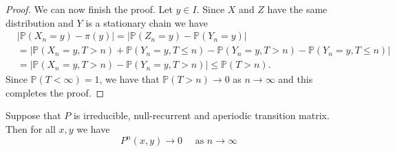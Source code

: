 \documentclass[a4paper]{article}
\begin{document}
\begin{proof}
    We can now finish the proof. Let $y \in I$. Since $X$ and $Z$ have the same distribution and $Y$ is a stationary chain we have
    \[
    \begin{aligned}
    &\left|\mathbb{P}\left(X_n=y\right)-\pi(y)\right|=\left|\mathbb{P}\left(Z_n=y\right)-\mathbb{P}\left(Y_n=y\right)\right| \\
    &=\left|\mathbb{P}\left(X_n=y, T>n\right)+\mathbb{P}\left(Y_n=y, T \leq n\right)-\mathbb{P}\left(Y_n=y, T>n\right)-\mathbb{P}\left(Y_n=y, T \leq n\right)\right| \\
    &=\left|\mathbb{P}\left(X_n=y, T>n\right)-\mathbb{P}\left(Y_n=y, T>n\right)\right| \leq \mathbb{P}(T>n) .
    \end{aligned}
    \]
    Since $\mathbb{P}(T<\infty)=1$, we have that $\mathbb{P}(T>n) \rightarrow 0$ as $n \rightarrow \infty$ and this completes the proof.
\end{proof}

\begin{theorem}
    Suppose that $P$ is irreducible, null-recurrent and aperiodic transition matrix. Then for all $x, y$ we have
    \[
    P^n(x, y) \rightarrow 0 \quad \text { as } n \rightarrow \infty
    \]
\end{theorem}
\end{document}
